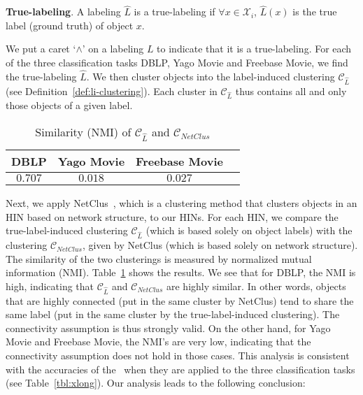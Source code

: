 \begin{definition}
{\bf True-labeling}.
A labeling $\hat{L}$ is a true-labeling if 
$\forall x \in \mathcal{X}_i$, $\hat{L}(x)$ is the true label (ground truth) of object $x$.
\end{definition}
We put a caret `$\wedge$' on a labeling $L$ to indicate that it is a true-labeling.
For each of the three classification tasks DBLP, Yago Movie and Freebase Movie,
we find the true-labeling $\hat{L}$.
We then cluster objects into the
label-induced clustering $\mathcal{C}_{\hat{L}}$ (see Definition~\ref{def:li-clustering}). 
Each cluster in $\mathcal{C}_{\hat{L}}$ thus contains all and only those objects of a given label.

\begin{table}
\caption{Similarity (NMI) of $\mathcal{C}_{\hat{L}}$ and $\mathcal{C}_{\mathit{NetClus}}$}
\centering
\small
\begin{tabular}{|c|c|c|c|} \hline
 DBLP & Yago Movie & Freebase Movie \\ \hline
$0.707$ & $0.018$ & $0.027$ \\ \hline
\end{tabular}
\label{table:global_nmi}
\end{table}


Next, we apply NetClus~\cite{DBLP:dblp_conf/kdd/SunYH09}, which is a clustering method
that clusters objects in an HIN based on network structure, to our HINs.
For each HIN, we compare the true-label-induced clustering $\mathcal{C}_{\hat{L}}$
(which is based solely on object labels) with
the clustering $\mathcal{C}_{\mathit{NetClus}}$, given by NetClus (which is based solely on network structure).
The similarity of the two clusterings is measured by  
normalized mutual information (NMI).
Table~\ref{table:global_nmi} shows the results.
We see that for DBLP, the NMI is high, indicating that $\mathcal{C}_{\hat{L}}$ and $\mathcal{C}_{\mathit{NetClus}}$
are highly similar. 
In other words, objects that are highly connected (put in the same cluster by NetClus) tend to share the same label
(put in the same cluster by the true-label-induced clustering).
The connectivity assumption is thus strongly valid. 
On the other hand, for Yago Movie and Freebase Movie, the NMI's are very low, indicating that
the connectivity assumption does not hold in those cases.  
This analysis is consistent with the accuracies of the \tcrs\ when they are applied to the three
classification tasks (see Table~\ref{tbl:xlong}).
Our analysis leads to the following conclusion:

